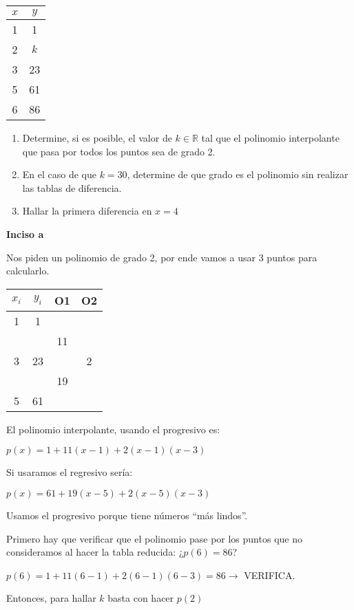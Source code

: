 \documentclass[11pt]{article}
\begin{document}
	\begin{tabular}{|c|c|}
		\hline
		$x$ & $y$\\
		\hline
		1 & 1\\
		\hline
		2 & $k$\\
		\hline
		3 & 23\\
		\hline
		5 & 61\\
		\hline
		6 & 86\\
		\hline
	\end{tabular}

	\begin{enumerate}[label=\alph*)]
		\item Determine, si es posible, el valor de $k \in \mathbb{R}$ tal que el polinomio interpolante que pasa por todos los puntos sea de grado 2.
		\item En el caso de que $k=30$, determine de que grado es el polinomio sin realizar las tablas de diferencia.
		\item Hallar la primera diferencia en $x=4$
	\end{enumerate}

	\textbf{Inciso a}
	
	Nos piden un polinomio de grado 2, por ende vamos a usar 3 puntos para calcularlo.
	
	\begin{tabular}{|c c c c|}
		\hline
		$x_i$ & $y_i$ & O1 & O2\\
		\hline
		1 & 1 & & \\
		& & 11 & \\
		3 & 23  & &2 \\
		& & 19 & \\
		5  & 61 & & \\
		\hline
	\end{tabular}

	El polinomio interpolante, usando el progresivo es:
	
	$p(x)=1+11(x-1)+2(x-1)(x-3)$
	
	Si usaramos el regresivo sería:
	
	$p(x)=61+19(x-5)+2(x-5)(x-3)$
	
	Usamos el progresivo porque tiene números ``más lindos''. 
	
	Primero hay que verificar que el polinomio pase por los puntos que no consideramos al hacer la tabla reducida: ¿$p(6)=86$?
	
	$p(6)=1+11(6-1)+2(6-1)(6-3)=86 \rightarrow$ VERIFICA.
	
	Entonces, para hallar $k$ basta con hacer $p(2)$
	
\end{document}
